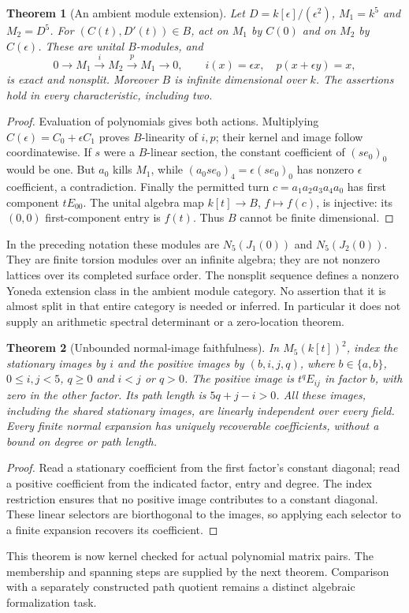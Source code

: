 \documentclass[11pt,oneside,openany]{book}
\newtheorem{theorem}{Theorem}[chapter]
\theoremstyle{definition}\newtheorem{definition}[theorem]{Definition}
\theoremstyle{remark}\newtheorem{remark}[theorem]{Remark}
\begin{document}
\begin{theorem}[An ambient module extension]\label{bre:extension}
Let $D=k[\epsilon]/(\epsilon^2)$, $M_1=k^5$ and $M_2=D^5$.
For $(C(t),D'(t))\in B$, act on $M_1$ by $C(0)$ and on $M_2$ by
$C(\epsilon)$. These are unital $B$-modules, and
\[
 0\longrightarrow M_1\xrightarrow{\ i\ }M_2
 \xrightarrow{\ p\ }M_1\longrightarrow0,
 \qquad i(x)=\epsilon x,\quad p(x+\epsilon y)=x,
\]
is exact and nonsplit. Moreover $B$ is infinite dimensional over $k$.
The assertions hold in every characteristic, including two.
\end{theorem}
\begin{proof}
Evaluation of polynomials gives both actions. Multiplying
$C(\epsilon)=C_0+\epsilon C_1$ proves $B$-linearity of $i,p$;
their kernel and image follow coordinatewise. If $s$ were a $B$-linear
section, the constant coefficient of $(s e_0)_0$ would be one. But $a_0$ kills
$M_1$, while $(a_0s e_0)_4=\epsilon(s e_0)_0$ has nonzero
$\epsilon$ coefficient, a contradiction. Finally the permitted turn
$c=a_1a_2a_3a_4a_0$ has first component $tE_{00}$.
The unital algebra map $k[t]\to B$, $f\mapsto f(c)$, is injective:
its $(0,0)$ first-component entry is $f(t)$. Thus $B$ cannot be
finite dimensional.
\end{proof}

In the preceding notation these modules are $N_5(J_1(0))$ and
$N_5(J_2(0))$. They are finite torsion modules over an infinite algebra;
they are not nonzero lattices over its completed surface order. The
nonsplit sequence defines a nonzero Yoneda extension class in the ambient
module category. No assertion that it is almost split in that entire
category is needed or inferred. In particular it does not supply an
arithmetic spectral determinant or a zero-location theorem.


\begin{theorem}[Unbounded normal-image faithfulness]\label{bre:normal-faithful}
In $M_5(k[t])^2$, index the stationary images by $i$ and the positive
images by $(b,i,j,q)$, where $b\in\{a,b\}$, $0\leq i,j<5$, $q\geq0$
and $i<j$ or $q>0$. The positive image is $t^qE_{ij}$ in factor $b$,
with zero in the other factor. Its path length is $5q+j-i>0$.
All these images, including the shared stationary images, are linearly
independent over every field. Every finite normal expansion has uniquely
recoverable coefficients, without a bound on degree or path length.
\end{theorem}
\begin{proof}
Read a stationary coefficient from the first factor's constant diagonal;
read a positive coefficient from the indicated factor, entry and degree.
The index restriction ensures that no positive image contributes to a
constant diagonal. These linear selectors are biorthogonal to the images,
so applying each selector to a finite expansion recovers its coefficient.
\end{proof}
This theorem is now kernel checked for actual polynomial matrix pairs.
The membership and spanning steps are supplied by the next theorem.
Comparison with a separately constructed path quotient remains a distinct
algebraic formalization task.
\end{document}
